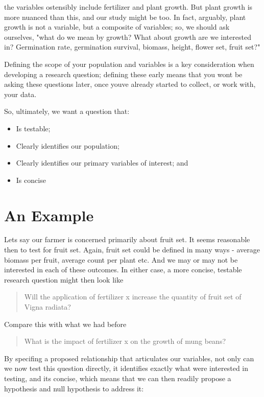 \documentclass[
]{book}
\providecommand{\tightlist}{%
  \setlength{\itemsep}{0pt}\setlength{\parskip}{0pt}}
\begin{document}
the variables ostensibly include fertilizer and plant growth. But plant growth is more nuanced than this, and our study might be too. In fact, arguably, plant growth is not a variable, but a composite of variables; so, we should ask ourselves, "what do we mean by growth? What about growth are we interested in? Germination rate, germination survival, biomass, height, flower set, fruit set?"

Defining the scope of your population and variables is a key consideration when developing a research question; defining these early means that you won\textquotesingle t be asking these questions later, once you\textquotesingle ve already started to collect, or work with, your data.

So, ultimately, we want a question that:

\begin{itemize}
\tightlist
\item
  Is testable;
\item
  Clearly identifies our population;
\item
  Clearly identifies our primary variables of interest; and
\item
  Is concise
\end{itemize}

\hypertarget{an-example}{%
\section*{An Example}\label{an-example}}

Let\textquotesingle s say our farmer is concerned primarily about fruit set. It seems reasonable then to test for fruit set. Again, fruit set could be defined in many ways - average biomass per fruit, average count per plant etc. And we may or may not be interested in each of these outcomes. In either case, a more concise, testable research question might then look like

\begin{quote}
Will the application of fertilizer x increase the quantity of fruit set of Vigna radiata?
\end{quote}

Compare this with what we had before

\begin{quote}
What is the impact of fertilizer x on the growth of mung beans?
\end{quote}

By specifing a proposed relationship that articulates our variables, not only can we now test this question directly, it identifies exactly what we\textquotesingle re interested in testing, and it\textquotesingle s concise, which means that we can then readily propose a hypothesis and null hypothesis to address it:
\end{document}
